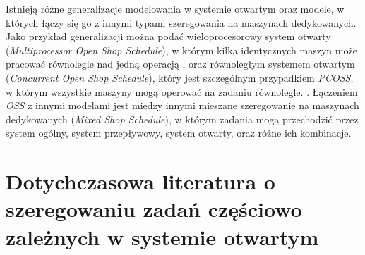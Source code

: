 \documentclass[brudnopis]{xmgr}
\begin{document}
Istnieją różne generalizacje modelowania w systemie otwartym oraz modele, w których łączy się go z innymi typami szeregowania na maszynach dedykowanych.
Jako przykład generalizacji można podać wieloprocesorowy system otwarty (\emph{Multiprocessor Open Shop Schedule}), w którym kilka identycznych maszyn może pracować równolegle nad jedną operacją \cite{adakmultiprocessor}, oraz równoległym systemem otwartym (\emph{Concurrent Open Shop Schedule}), który jest szczególnym przypadkiem \emph{PCOSS}, w którym wszystkie maszyny mogą operować na zadaniu równolegle. \cite{wagneur1993openshops}.
Łączeniem \emph{OSS} z innymi modelami jest między innymi mieszane szeregowanie na maszynach dedykowanych (\emph{Mixed Shop Schedule}), w którym zadania mogą przechodzić przez system ogólny, system przepływowy, system otwarty, oraz różne ich kombinacje.


\section{Dotychczasowa literatura o szeregowaniu zadań częściowo zależnych w systemie otwartym}
\end{document}
